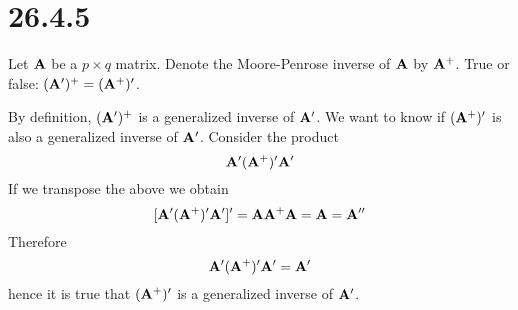 \section*{26.4.5}
Let $\bf A$ be a $p\times q$ matrix.
Denote the Moore-Penrose inverse of $\bf A$ by ${\bf A}^+$.
True or false: $({\bf A}')^+=({\bf A}^+)'$.

\bigskip
\noindent
By definition, $({\bf A}')^+$
is a generalized inverse of ${\bf A}'$.
We want to know if $({\bf A}^+)'$ is also a generalized inverse
of ${\bf A}'$.
Consider the product
$${\bf A}'({\bf A}^+)'{\bf A}'$$
If we transpose the above we obtain
$$[{\bf A}'({\bf A}^+)'{\bf A}']'={\bf A}{\bf A}^+{\bf A}={\bf A}=
{\bf A}''$$
Therefore
$${\bf A}'({\bf A}^+)'{\bf A}'={\bf A}'$$
hence it is true that $({\bf A}^+)'$ is a generalized inverse of
${\bf A}'$.
